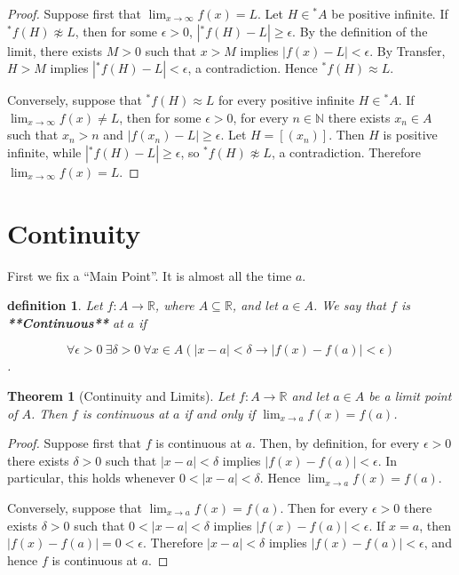 \documentclass[10pt,a4paper]{book}
\newtheorem{definition}{definition}[section]
\newtheorem{theorem}{Theorem}[section]
\begin{document}
\begin{proof}

    Suppose first that $\lim_{x\to\infty}f(x)=L$. Let $H\in{}^*A$ be positive
    infinite. If ${}^*f(H)\not\approx L$, then for some $\epsilon>0$,
    $|{}^*f(H)-L|\geq\epsilon$. By the definition of the limit, there exists $M>0$
    such that $x>M$ implies $|f(x)-L|<\epsilon$. By Transfer, $H>M$ implies
    $|{}^*f(H)-L|<\epsilon$, a contradiction. Hence ${}^*f(H)\approx L$.

    Conversely, suppose that ${}^*f(H)\approx L$ for every positive infinite
    $H\in{}^*A$. If $\lim_{x\to\infty}f(x)\neq L$, then for some $\epsilon>0$, for
    every $n\in\mathbb N$ there exists $x_n\in A$ such that $x_n>n$ and
    $|f(x_n)-L|\geq\epsilon$. Let $H=[(x_n)]$. Then $H$ is positive infinite, while
    $|{}^*f(H)-L|\geq\epsilon$, so ${}^*f(H)\not\approx L$, a contradiction.
    Therefore $\lim_{x\to\infty}f(x)=L$.

\end{proof}
\section{Continuity}

First we fix a ``Main Point''. It is almost all the time $a$.

\begin{definition}

    Let $f:A\to\mathbb R$, where $A\subseteq\mathbb R$, and let $a\in A$. We say
    that $f$ is \textbf{**Continuous**} at $a$ if

    $$\forall\epsilon>0\
        \exists\delta>0\ \forall x\in A \left(|x-a|<\delta
        \to|f(x)-f(a)|<\epsilon\right)$$.

\end{definition}

\begin{theorem}[Continuity and Limits]

    Let $f:A\to\mathbb R$ and let $a\in A$ be a limit point of $A$. Then $f$ is
    continuous at $a$ if and only if $\lim_{x\to a}f(x)=f(a)$.

\end{theorem}

\begin{proof}

    Suppose first that $f$ is continuous at $a$. Then, by definition, for every
    $\epsilon>0$ there exists $\delta>0$ such that $|x-a|<\delta$ implies
    $|f(x)-f(a)|<\epsilon$. In particular, this holds whenever $0<|x-a|<\delta$.
    Hence $\lim_{x\to a}f(x)=f(a)$.

    Conversely, suppose that $\lim_{x\to a}f(x)=f(a)$. Then for every $\epsilon>0$
    there exists $\delta>0$ such that $0<|x-a|<\delta$ implies
    $|f(x)-f(a)|<\epsilon$. If $x=a$, then $|f(x)-f(a)|=0<\epsilon$. Therefore
    $|x-a|<\delta$ implies $|f(x)-f(a)|<\epsilon$, and hence $f$ is continuous at
    $a$.

\end{proof}
\end{document}
